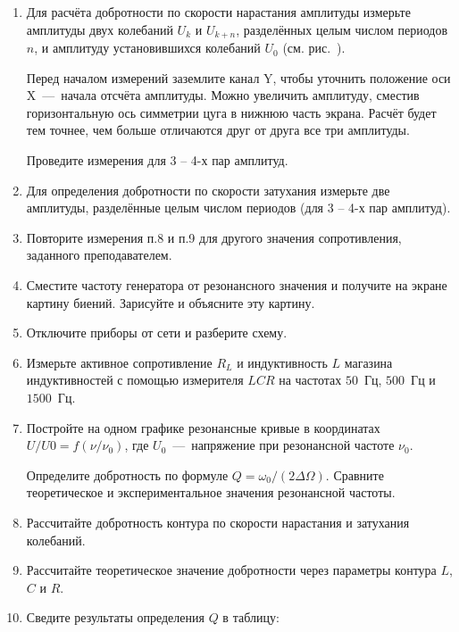\begin{lab:task}
\begin{enumerate}
	\item Для расчёта добротности по скорости нарастания амплитуды измерьте
амплитуды двух колебаний $U_k$ и $U_{k+n}$, разделённых целым числом периодов $n$,
и амплитуду установившихся колебаний $U_0$ (см. рис.~).

Перед началом измерений заземлите канал Y, чтобы уточнить положение оси
X~---~начала отсчёта амплитуды. Можно увеличить амплитуду, сместив
горизонтальную ось симметрии цуга в нижнюю часть экрана. Расчёт будет
тем точнее, чем больше отличаются друг от друга все три амплитуды.

Проведите измерения для 3 -- 4-х пар амплитуд.

	\item Для определения добротности по скорости затухания измерьте две
амплитуды, разделённые целым числом периодов (для 3 -- 4-х пар амплитуд).

	\item Повторите измерения п.8 и п.9 для другого значения сопротивления,
заданного преподавателем.

	\item Сместите частоту генератора от резонансного значения и получите на
экране картину биений. Зарисуйте и объясните эту картину.

	\item Отключите приборы от сети и разберите схему.

	\item Измерьте активное сопротивление $R_L$ и индуктивность $L$ магазина
индуктивностей с помощью измерителя $LCR$ на частотах $50$~Гц, $500$~Гц и $1500$~Гц.


	\item Постройте на одном графике резонансные кривые в координатах $U/U0 = f(
\nu/\nu_0)$, где $U_0$~---~напряжение при резонансной частоте $\nu_0$.

Определите добротность по формуле $Q = \omega_0/(2\Delta\Omega)$. Сравните теоретическое и
экспериментальное значения резонансной частоты.

	\item Рассчитайте добротность контура по скорости нарастания и затухания
колебаний.

	\item Рассчитайте теоретическое значение добротности через параметры
контура $L$, $C$ и $R$.

	\item Сведите результаты определения $Q$ в таблицу:
	

\end{enumerate}
\end{lab:task}
